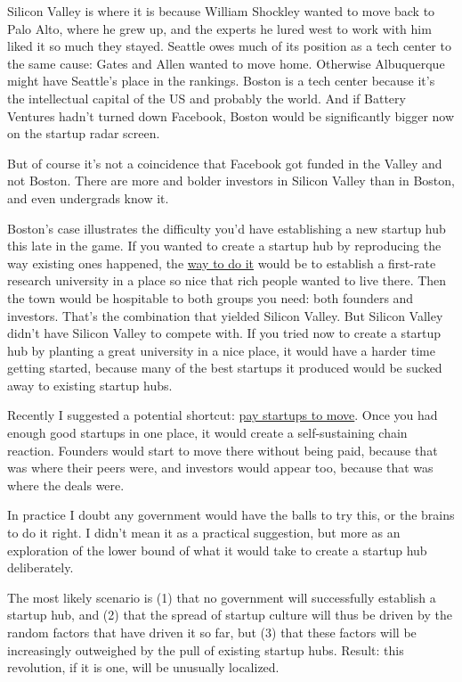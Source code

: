 \documentclass[12pt]{book}
\begin{document}
Silicon Valley is where it is because William Shockley wanted to move
back to Palo Alto, where he grew up, and the experts he lured west to
work with him liked it so much they stayed. Seattle owes much of its
position as a tech center to the same cause: Gates and Allen wanted to
move home. Otherwise Albuquerque might have Seattle's place in the
rankings. Boston is a tech center because it's the intellectual capital
of the US and probably the world. And if Battery Ventures hadn't turned
down Facebook, Boston would be significantly bigger now on the startup
radar screen.

But of course it's not a coincidence that Facebook got funded in the
Valley and not Boston. There are more and bolder investors in Silicon
Valley than in Boston, and even undergrads know it.

Boston's case illustrates the difficulty you'd have establishing a new
startup hub this late in the game. If you wanted to create a startup hub
by reproducing the way existing ones happened, the
\href{siliconvalley.html}{way to do it} would be to establish a
first-rate research university in a place so nice that rich people
wanted to live there. Then the town would be hospitable to both groups
you need: both founders and investors. That's the combination that
yielded Silicon Valley. But Silicon Valley didn't have Silicon Valley to
compete with. If you tried now to create a startup hub by planting a
great university in a nice place, it would have a harder time getting
started, because many of the best startups it produced would be sucked
away to existing startup hubs.

Recently I suggested a potential shortcut: \href{maybe.html}{pay
startups to move}. Once you had enough good startups in one place, it
would create a self-sustaining chain reaction. Founders would start to
move there without being paid, because that was where their peers were,
and investors would appear too, because that was where the deals were.

In practice I doubt any government would have the balls to try this, or
the brains to do it right. I didn't mean it as a practical suggestion,
but more as an exploration of the lower bound of what it would take to
create a startup hub deliberately.

The most likely scenario is (1) that no government will successfully
establish a startup hub, and (2) that the spread of startup culture will
thus be driven by the random factors that have driven it so far, but (3)
that these factors will be increasingly outweighed by the pull of
existing startup hubs. Result: this revolution, if it is one, will be
unusually localized.
\end{document}
